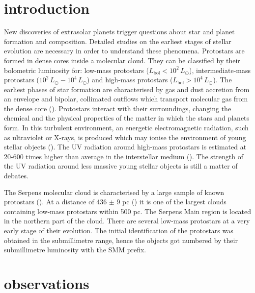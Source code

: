 \documentclass[a4paper]{article}
\begin{document}
\section*{\sc introduction}
\indent \indent New discoveries of extrasolar planets trigger questions about star and planet formation and composition. Detailed studies on the earliest stages of stellar evolution are necessary in order to understand these phenomena. Protostars are formed in dense cores inside a molecular cloud. They can be classified by their bolometric luminosity for: low-mass protostars ($L_{\mathrm{bol}} < 10^2 \, L{_\odot}$), intermediate-mass protostars ($10^2 \, L{_\odot} - 10^4 \, L{_\odot}$) and high-mass protostars ($L_{\mathrm{bol}} > 10^4 \, L{_\odot}$). The earliest phases of star formation are characterised by gas and dust accretion from an envelope and bipolar, collimated outflows which transport molecular gas from the dense core (\cite{arce2006}). Protostars interact with their surroundings, changing the chemical and the physical properties of the matter in which the stars and planets form. In this turbulent environment, an energetic electromagnetic radiation, such as ultraviolet or X-rays, is produced which may ionise the environment of young stellar objects (\cite{stauber2007}). The UV radiation around high-mass protostars is estimated at 20-600 times higher than average in the interstellar medium (\cite{benz2016}). The strength of the UV radiation around less massive young stellar objects is still a matter of debates. 

\indent \indent The Serpens molecular cloud is characterised by a large sample of known protostars (\cite{evans2009}). At a distance of 436 $\pm$ 9 pc (\cite{ortiz2017}) it is one of the largest clouds containing low-mass protostars within 500 pc. The Serpens Main region is located in the northern part of the cloud. There are several low-mass protostars at a very early stage of their evolution. The initial identification of the protostars was obtained in the submillimetre range, hence the objects got numbered by their submillimetre luminosity with the SMM prefix. 

\section*{\sc observations}
\end{document}
